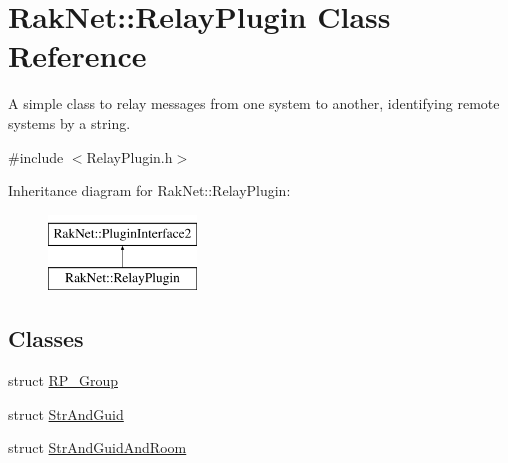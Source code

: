 \hypertarget{class_rak_net_1_1_relay_plugin}{\section{Rak\-Net\-:\-:Relay\-Plugin Class Reference}
\label{class_rak_net_1_1_relay_plugin}
}


A simple class to relay messages from one system to another, identifying remote systems by a string.  




{\ttfamily \#include $<$Relay\-Plugin.\-h$>$}

Inheritance diagram for Rak\-Net\-:\-:Relay\-Plugin\-:\begin{figure}[H]
\begin{center}
\leavevmode
\includegraphics[height=2.000000cm]{class_rak_net_1_1_relay_plugin}
\end{center}
\end{figure}
\subsection*{Classes}
\begin{DoxyCompactItemize}
\item 
struct \hyperlink{struct_rak_net_1_1_relay_plugin_1_1_r_p___group}{R\-P\-\_\-\-Group}
\item 
struct \hyperlink{struct_rak_net_1_1_relay_plugin_1_1_str_and_guid}{Str\-And\-Guid}
\item 
struct \hyperlink{struct_rak_net_1_1_relay_plugin_1_1_str_and_guid_and_room}{Str\-And\-Guid\-And\-Room}
\end{DoxyCompactItemize}
